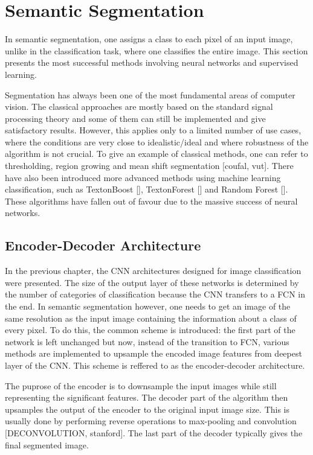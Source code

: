 \section{Semantic Segmentation}

In semantic segmentation, one assigns a class to each pixel of an input image, unlike in the classification task, where one classifies the entire image. This section presents the most successful methods involving neural networks and supervised learning. 

Segmentation has always been one of the most fundamental areas of computer vision. The classical approaches are mostly based on the standard signal processing theory and some of them can still be implemented and give satisfactory results. However, this applies only to a limited number of use cases, where the conditions are very close to idealistic/ideal and where robustness of the algorithm is not crucial. To give an example of classical methods, one can refer to thresholding, region growing and mean shift segmentation [coufal, vut]. There have also been introduced more advanced methods using machine learning classification, such as TextonBoost [], TextonForest [] and Random Forest []. These algorithms have fallen out of favour due to the massive success of neural networks.

\subsection{Encoder-Decoder Architecture}

In the previous chapter, the CNN architectures designed for image classification were presented. The size of the output layer of these networks is determined by the number of categories of classification because the CNN transfers to a FCN in the end. In semantic segmentation however, one needs to get an image of the same resolution as the input image containing the information about a class of every pixel. To do this, the common scheme is introduced: the first part of the network is left unchanged but now, instead of the transition to FCN, various methods are implemented to upsample the encoded image features from deepest layer of the CNN. This scheme is reffered to as the encoder-decoder architecture. 

The puprose of the encoder is to downsample the input images while still representing the significant features. The decoder part of the algorithm then upsamples the output of the encoder to the original input image size. This is usually done by performing reverse operations to max-pooling and convolution [DECONVOLUTION, stanford]. The last part of the decoder typically gives the final segmented image. 


